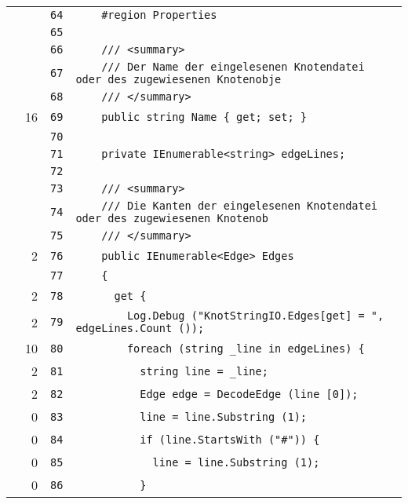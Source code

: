 \documentclass[a4paper,10pt]{article}
\begin{document}
\begin{longtable}[l]{lrrl}
\cellcolor{gray} &  & \verb~64~ & \verb~    #region Properties~\\
\cellcolor{gray} &  & \verb~65~ & \verb~~\\
\cellcolor{gray} &  & \verb~66~ & \verb~    /// <summary>~\\
\cellcolor{gray} &  & \verb~67~ & \verb~    /// Der Name der eingelesenen Knotendatei oder des zugewiesenen Knotenobje~\\
\cellcolor{gray} &  & \verb~68~ & \verb~    /// </summary>~\\
\cellcolor{green} & 16 & \verb~69~ & \verb~    public string Name { get; set; }~\\
\cellcolor{gray} &  & \verb~70~ & \verb~~\\
\cellcolor{gray} &  & \verb~71~ & \verb~    private IEnumerable<string> edgeLines;~\\
\cellcolor{gray} &  & \verb~72~ & \verb~~\\
\cellcolor{gray} &  & \verb~73~ & \verb~    /// <summary>~\\
\cellcolor{gray} &  & \verb~74~ & \verb~    /// Die Kanten der eingelesenen Knotendatei oder des zugewiesenen Knotenob~\\
\cellcolor{gray} &  & \verb~75~ & \verb~    /// </summary>~\\
\cellcolor{green} & 2 & \verb~76~ & \verb~    public IEnumerable<Edge> Edges~\\
\cellcolor{gray} &  & \verb~77~ & \verb~    {~\\
\cellcolor{green} & 2 & \verb~78~ & \verb~      get {~\\
\cellcolor{green} & 2 & \verb~79~ & \verb~        Log.Debug ("KnotStringIO.Edges[get] = ", edgeLines.Count ());~\\
\cellcolor{green} & 10 & \verb~80~ & \verb~        foreach (string _line in edgeLines) {~\\
\cellcolor{green} & 2 & \verb~81~ & \verb~          string line = _line;~\\
\cellcolor{green} & 2 & \verb~82~ & \verb~          Edge edge = DecodeEdge (line [0]);~\\
\cellcolor{red} & 0 & \verb~83~ & \verb~          line = line.Substring (1);~\\
\cellcolor{red} & 0 & \verb~84~ & \verb~          if (line.StartsWith ("#")) {~\\
\cellcolor{red} & 0 & \verb~85~ & \verb~            line = line.Substring (1);~\\
\cellcolor{red} & 0 & \verb~86~ & \verb~          }~\\

\end{longtable}
\end{document}
